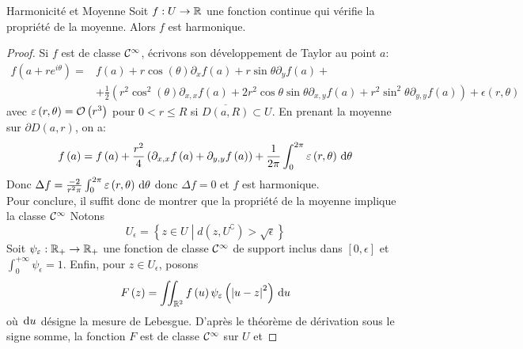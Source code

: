 \documentclass{cours}
\begin{document}
\begin{théorème}
	{Harmonicité et Moyenne}{}
	Soit $f : U \to \mathbb{R}$ une fonction continue qui vérifie la propriété de la moyenne. Alors $f$ est harmonique.
\end{théorème}
\begin{proof}
	Si $f$ est de classe $\mathcal{C}^{\infty}$, écrivons son développement de Taylor au point $a$: 
	\begin{equation*}
		\begin{aligned}
		f\left(a + re^{i\theta}\right) =& f\left(a\right) + r\cos\left(\theta\right)\partial_{x}f\left(a\right) + r \sin\theta \partial_{y}f\left(a\right) +\\
		& +\frac{1}{2}\left(r^{2}\cos^{2}\left(\theta\right)\partial_{x, x}f\left(a\right) + 2r^{2}\cos \theta \sin \theta \partial_{x, y}f\left(a\right) + r^{2}\sin^{2}\theta \partial_{y, y}f\left(a\right)\right) + \epsilon\left(r, \theta\right)
		\end{aligned}
	\end{equation*}
	avec $\varepsilon\left(r, \theta\right) = \mathcal{O}\left(r^{3}\right)$ pour $0 < r \leq R$ si $\overline{D\left(a, R\right)} \subset U$. En prenant la moyenne sur $\partial D\left(a, r\right)$, on a: 
	\begin{equation*}
		f\left(a\right) = f\left(a\right) + \frac{r^{2}}{4}\left(\partial_{x, x}f\left(a\right) + \partial_{y, y}f\left(a\right)\right) + \frac{1}{2\pi}\int_{0}^{2\pi} \varepsilon\left(r, \theta\right) {\rm \, d} \theta
	\end{equation*}
	Donc $\Delta f= \frac{-2}{r^{2}\pi}\int_{0}^{2\pi}\varepsilon\left(r, \theta\right) {\rm \, d} \theta$ donc $\Delta f = 0$ et $f$ est harmonique. \\
	Pour conclure, il suffit donc de montrer que la propriété de la moyenne implique la classe $\mathcal{C}^{\infty}$
	Notons
	\begin{equation*}
		U_{\epsilon} = \left\{z \in U \middle| d\left(z, U^{\complement}\right) > \sqrt{\epsilon}\right\}
	\end{equation*}
	Soit $\psi_{\varepsilon} : \mathbb{R}_{+} \to \mathbb{R}_{+}$ une fonction de classe $\mathcal{C}^{\infty}$ de support inclus dans $\left[0, \epsilon\right]$ et $\int_{0}^{+\infty}\psi_{\epsilon} = 1$. Enfin, pour $z \in U_{\epsilon}$, posons
	\begin{equation*}
		F\left(z\right) = \iint_{\mathbb{R}^{2}} f\left(u\right)\psi_{\varepsilon}\left(\left|u - z\right|^{2}\right){\rm \, d} u
	\end{equation*}
	où ${\rm \, d} u$ désigne la mesure de Lebesgue. D'après le théorème de dérivation sous le signe somme, la fonction $F$ est de classe $\mathcal{C}^{\infty}$ sur $U$ et

\end{proof}
\end{document}
